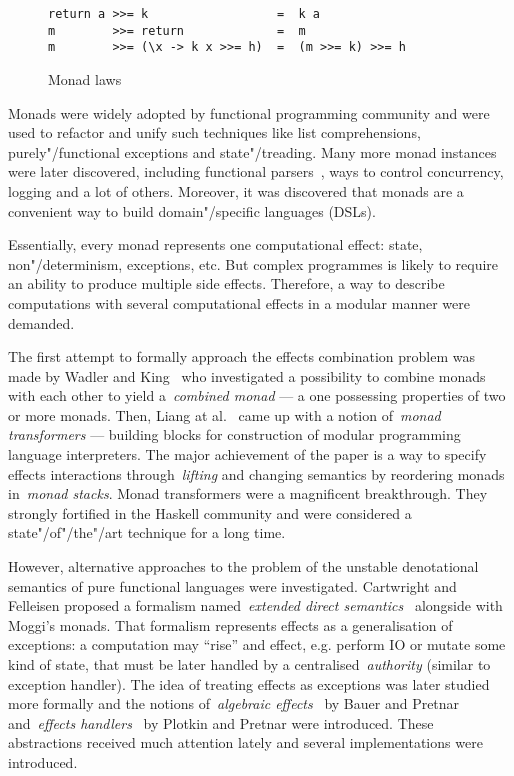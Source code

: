     \begin{figure}[h]
    \begin{lstlisting}
return a >>= k                  =  k a
m        >>= return             =  m
m        >>= (\x -> k x >>= h)  =  (m >>= k) >>= h
    \end{lstlisting}
    \caption{Monad laws}
    \label{listing:monadLaws}
    \end{figure}

Monads were widely adopted by functional programming community and were used to
refactor and unify such techniques like list comprehensions, purely"/functional
exceptions and state"/treading. Many more monad instances were later discovered,
including functional parsers~\cite{monParsing}, ways to control concurrency,
logging and a lot of others. Moreover, it was discovered that monads are a convenient
way to build domain"/specific languages (DSLs).

Essentially, every monad represents one computational effect: state,
non"/determinism, exceptions, etc. But complex programmes is likely to require an
ability to produce multiple side effects. Therefore, a way to describe
computations with several computational effects in a modular manner were demanded.

The first attempt to formally approach the effects combination problem was made
by Wadler and King~\cite{DBLP:conf/fp/KingW92} who investigated a possibility to
combine monads with each other to yield a~\emph{combined monad} --- a one possessing
properties of two or more monads. Then, Liang at al.~\cite{Liang:1995:MTM:199448.199528}
came up with a notion of~\emph{monad transformers} --- building blocks for construction
of modular programming language interpreters. The major achievement of the paper
is a way to specify effects interactions through~\emph{lifting} and changing
semantics by reordering monads in~\emph{monad stacks}. Monad transformers were a
magnificent breakthrough. They strongly fortified in the Haskell community and were
considered a state"/of"/the"/art technique for a long time.

However, alternative approaches to the problem of the unstable denotational semantics
of pure functional languages were investigated. Cartwright and Felleisen proposed
a formalism named~\emph{extended direct semantics}~\cite{Cartwright1994} alongside
with Moggi's monads. That formalism represents effects as a generalisation of exceptions:
a computation may ``rise'' and effect, e.g. perform IO or mutate some kind of state, that
must be later handled by a centralised~\emph{authority} (similar to exception handler).
The idea of treating effects as exceptions was later studied more formally and the
notions of~\emph{algebraic effects}~\cite{DBLP:journals/jlp/BauerP15} by Bauer and Pretnar
and~\emph{effects handlers}~\cite{Plotkin2009} by Plotkin and Pretnar were introduced. These
abstractions received much attention lately and several implementations were introduced.

